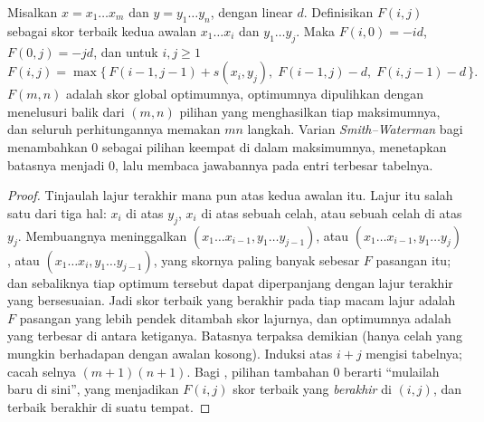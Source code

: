 \begin{theorem}\label{thm:b3:bioinformatics:nw}
Misalkan $x = x_{1}\dots x_{m}$ dan $y = y_{1}\dots y_{n}$, dengan  linear $d$. Definisikan $F(i,j)$ sebagai skor terbaik 
kedua awalan $x_{1}\dots x_{i}$ dan $y_{1}\dots y_{j}$. Maka
$F(i,0) = -id$, $F(0,j) = -jd$, dan untuk $i,j \ge 1$
\[
F(i,j) = \max\bigl\{\,F(i-1,j-1) + s(x_{i},y_{j}),\;
F(i-1,j) - d,\; F(i,j-1) - d\,\bigr\}.
\]
$F(m,n)$ adalah skor global optimumnya,  optimumnya dipulihkan
dengan menelusuri balik dari $(m,n)$ pilihan yang menghasilkan tiap
maksimumnya, dan seluruh perhitungannya memakan $mn$ langkah. Varian
\emph{Smith--Waterman} bagi  menambahkan $0$ sebagai pilihan
keempat di dalam maksimumnya, menetapkan batasnya menjadi $0$, lalu membaca
jawabannya pada entri terbesar tabelnya.
\end{theorem}
\begin{proof}
Tinjaulah lajur terakhir  mana pun atas kedua awalan itu. Lajur itu
salah satu dari tiga hal: $x_{i}$ di atas $y_{j}$, $x_{i}$ di atas sebuah
celah, atau sebuah celah di atas $y_{j}$. Membuangnya meninggalkan 
$(x_{1}\dots x_{i-1},
y_{1}\dots y_{j-1})$, atau $(x_{1}\dots x_{i-1}, y_{1}\dots y_{j})$, atau
$(x_{1}\dots x_{i}, y_{1}\dots y_{j-1})$, yang skornya paling banyak sebesar
$F$ pasangan itu; dan sebaliknya tiap  optimum tersebut
dapat diperpanjang dengan lajur terakhir yang bersesuaian. Jadi skor terbaik
yang berakhir pada tiap macam lajur adalah $F$ pasangan yang lebih pendek
ditambah skor lajurnya, dan optimumnya adalah yang terbesar di antara
ketiganya. Batasnya terpaksa demikian (hanya celah yang mungkin berhadapan
dengan awalan kosong). Induksi atas $i + j$ mengisi tabelnya; cacah selnya
$(m+1)(n+1)$. Bagi , pilihan tambahan $0$ berarti ``mulailah
 baru di sini'', yang menjadikan $F(i,j)$ skor terbaik 
yang \emph{berakhir} di $(i,j)$, dan  terbaik berakhir di suatu tempat.
\end{proof}

